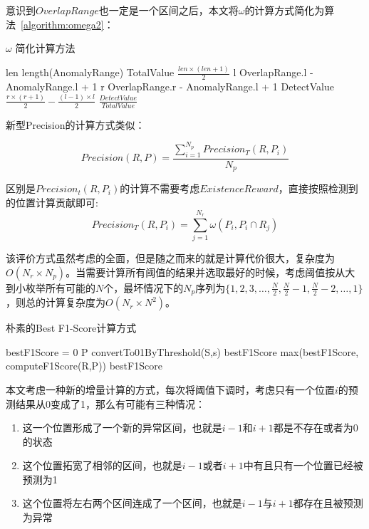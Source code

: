 意识到$OverlapRange$也一定是一个区间之后，本文将$\omega$的计算方式简化为算法~\ref{algorithm:omega2}：
  \begin{algorithm}
    \caption{$\omega$ 简化计算方法}
    \begin{algorithmic}[1]
        \State len \gets length(AnomalyRange)
        \State TotalValue \gets $\frac{len \times (len + 1)}{2}$
        \State l \gets OverlapRange.l - AnomalyRange.l + 1
        \State r \gets OverlapRange.r - AnomalyRange.l + 1
        \State DetectValue \gets $\frac{r \times (r+1)}{2} - \frac{(l-1) \times l}{2}$
        \State \Return $\frac{DetectValue}{TotalValue}$
        \EndFunction
    \end{algorithmic}
    \label{algorithm:omega2}
  \end{algorithm}

新型Precision的计算方式类似：

\begin{equation*}
Precision(R,P) = \frac{\sum\limits_{i=1}^{N_p}Precision_T(R,P_i)}{N_p}
\end{equation*}

区别是$Precision_t(R,P_i)$的计算不需要考虑$ExistenceReward$，直接按照检测到的位置计算贡献即可:
\begin{equation*}
Precision_T(R,P_i) = \sum_{j=1}^{N_r}\omega(P_i,P_i\cap R_j)
\end{equation*}

  该评价方式虽然考虑的全面，但是随之而来的就是计算代价很大，复杂度为$O(N_r\times N_p)$。当需要计算所有阈值的结果并选取最好的时候，考虑阈值按从大到小枚举所有可能的$N$个，最坏情况下的$N_p$序列为$\{1,2,3,\dots,\frac{N}{2},\frac{N}{2}-1,\frac{N}{2}-2,\dots,1\}$，则总的计算复杂度为$O(N_r\times N^2)$。

  \begin{algorithm}
  \caption{朴素的Best F1-Score计算方式}
  \begin{algorithmic}[1]
    \State bestF1Score = 0
    \State P \gets convertTo01ByThreshold(S,s)
    \State bestF1Score \gets max(bestF1Score, computeF1Score(R,P))
    \EndFor
    \State \Return bestF1Score
    \EndFunction
  \end{algorithmic}
  \end{algorithm}


  本文考虑一种新的增量计算的方式，每次将阈值下调时，考虑只有一个位置$i$的预测结果从0变成了1，那么有可能有三种情况：
  \begin{enumerate}
    \item 这一个位置形成了一个新的异常区间，也就是$i-1$和$i+1$都是不存在或者为0的状态
    \item 这个位置拓宽了相邻的区间，也就是$i-1$或者$i+1$中有且只有一个位置已经被预测为1
    \item 这个位置将左右两个区间连成了一个区间，也就是$i-1$与$i+1$都存在且被预测为异常
  \end{enumerate}

